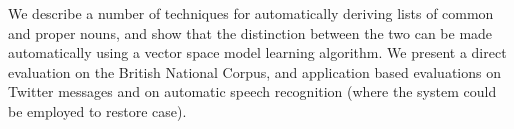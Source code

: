 We describe a number of techniques for automatically deriving lists of common and proper nouns, and show that the distinction between the two can be made
 automatically using a vector space model learning algorithm. We present a
 direct evaluation on the British National Corpus, and application based
 evaluations on Twitter messages and on automatic speech recognition (where the
 system could be employed to restore case).

